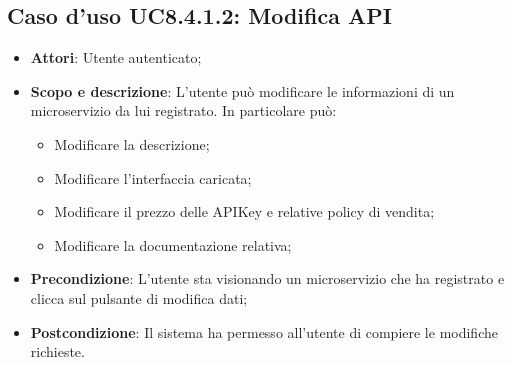 \documentclass[12pt,a4paper,titlepage]{article}
\begin{document}
	\subsection{Caso d'uso UC8.4.1.2: Modifica API}
	\label{UC8.4.1.2}
	\begin{itemize}
		\item \textbf{Attori}: Utente autenticato;
		\item \textbf{Scopo e descrizione}: L'utente può modificare le informazioni di un microservizio da lui registrato. In particolare può:
		\begin{itemize}
			\item Modificare la descrizione;
			\item Modificare l'interfaccia caricata;
			\item Modificare il prezzo delle APIKey e relative policy di vendita;
			\item Modificare la documentazione relativa;
		\end{itemize}
		\item \textbf{Precondizione}: L'utente sta visionando un microservizio che ha registrato e clicca sul pulsante di modifica dati;
		\item \textbf{Postcondizione}: Il sistema ha permesso all'utente di compiere le modifiche richieste.
	\end{itemize}
\end{document}

